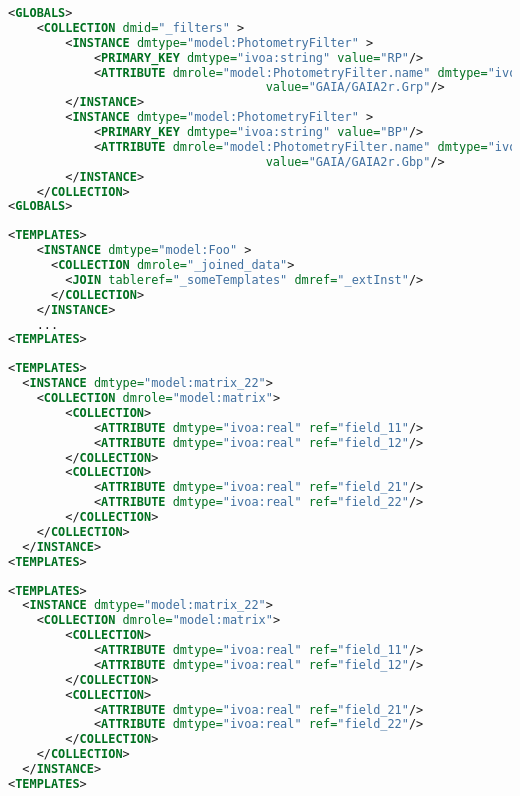 \begin{lstlisting}[caption={Example of \texttt{COLLECTION} child of \texttt{GLOBALS}.},language=XML]
<GLOBALS>
    <COLLECTION dmid="_filters" >
        <INSTANCE dmtype="model:PhotometryFilter" >
            <PRIMARY_KEY dmtype="ivoa:string" value="RP"/>
            <ATTRIBUTE dmrole="model:PhotometryFilter.name" dmtype="ivoa:string"
                                    value="GAIA/GAIA2r.Grp"/>
        </INSTANCE>
        <INSTANCE dmtype="model:PhotometryFilter" >
            <PRIMARY_KEY dmtype="ivoa:string" value="BP"/>
            <ATTRIBUTE dmrole="model:PhotometryFilter.name" dmtype="ivoa:string"
                                    value="GAIA/GAIA2r.Gbp"/>
        </INSTANCE>
    </COLLECTION>
<GLOBALS>
\end{lstlisting}   

\begin{lstlisting}[caption={Example of \texttt{COLLECTION} populated with a JOIN. See Appendix..~\ref{appen_join}.},language=XML]
<TEMPLATES>
    <INSTANCE dmtype="model:Foo" >    
      <COLLECTION dmrole="_joined_data">
        <JOIN tableref="_someTemplates" dmref="_extInst"/>
      </COLLECTION>
    </INSTANCE>
    ...
<TEMPLATES>
\end{lstlisting}   

\begin{lstlisting}[caption={Example of \texttt{COLLECTION} mapping a 2x2 matrix},language=XML]
<TEMPLATES>
  <INSTANCE dmtype="model:matrix_22">
    <COLLECTION dmrole="model:matrix">
    	<COLLECTION>
        	<ATTRIBUTE dmtype="ivoa:real" ref="field_11"/>
        	<ATTRIBUTE dmtype="ivoa:real" ref="field_12"/>
    	</COLLECTION>
    	<COLLECTION>
        	<ATTRIBUTE dmtype="ivoa:real" ref="field_21"/>
        	<ATTRIBUTE dmtype="ivoa:real" ref="field_22"/>
    	</COLLECTION>
    </COLLECTION>
  </INSTANCE>
<TEMPLATES>
\end{lstlisting}   

\begin{lstlisting}[caption={Example of \texttt{COLLECTION} mapping a 2x2 matrix},language=XML]
<TEMPLATES>
  <INSTANCE dmtype="model:matrix_22">
    <COLLECTION dmrole="model:matrix">
    	<COLLECTION>
        	<ATTRIBUTE dmtype="ivoa:real" ref="field_11"/>
        	<ATTRIBUTE dmtype="ivoa:real" ref="field_12"/>
    	</COLLECTION>
    	<COLLECTION>
        	<ATTRIBUTE dmtype="ivoa:real" ref="field_21"/>
        	<ATTRIBUTE dmtype="ivoa:real" ref="field_22"/>
    	</COLLECTION>
    </COLLECTION>
  </INSTANCE>
<TEMPLATES>
\end{lstlisting}   


